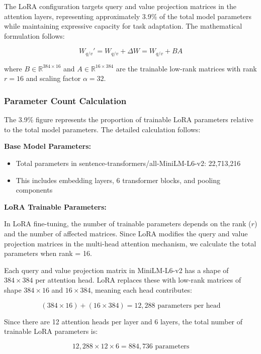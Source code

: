 The LoRA configuration targets query and value projection matrices in the attention layers, representing approximately 3.9\% of the total model parameters while maintaining expressive capacity for task adaptation. The mathematical formulation follows:

\begin{equation}
W_{q/v}' = W_{q/v} + \Delta W = W_{q/v} + B A
\end{equation}

where $B \in \mathbb{R}^{384 \times 16}$ and $A \in \mathbb{R}^{16 \times 384}$ are the trainable low-rank matrices with rank $r=16$ and scaling factor $\alpha=32$.

\subsubsection{Parameter Count Calculation}

The 3.9\% figure represents the proportion of trainable LoRA parameters relative to the total model parameters. The detailed calculation follows:

\textbf{Base Model Parameters:}
\begin{itemize}
\item Total parameters in sentence-transformers/all-MiniLM-L6-v2: 22,713,216
\item This includes embedding layers, 6 transformer blocks, and pooling components
\end{itemize}

\textbf{LoRA Trainable Parameters:}

In LoRA fine-tuning, the number of trainable parameters depends on the rank ($r$) and the number of affected matrices. Since LoRA modifies the query and value projection matrices in the multi-head attention mechanism, we calculate the total parameters when rank = 16.

Each query and value projection matrix in MiniLM-L6-v2 has a shape of $384 \times 384$ per attention head. LoRA replaces these with low-rank matrices of shape $384 \times 16$ and $16 \times 384$, meaning each head contributes:

\begin{equation}
(384 \times 16) + (16 \times 384) = 12,288 \text{ parameters per head}
\end{equation}

Since there are 12 attention heads per layer and 6 layers, the total number of trainable LoRA parameters is:

\begin{equation}
12,288 \times 12 \times 6 = 884,736 \text{ parameters}
\end{equation}

